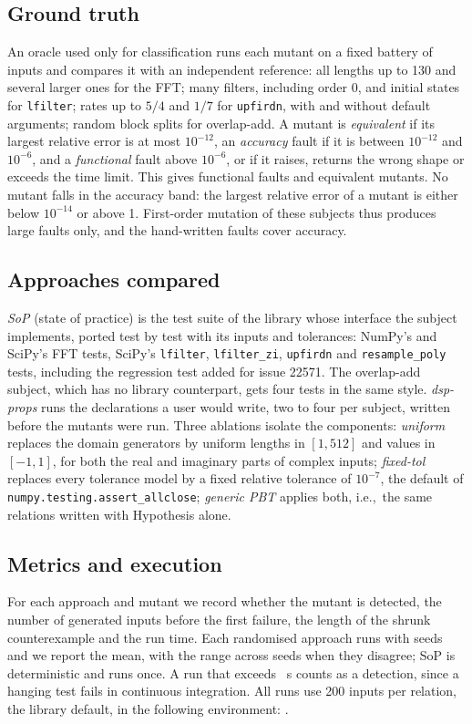 \documentclass[10pt,conference]{IEEEtran}
\newcommand{\code}[1]{\texttt{#1}}
\newcommand{\ie}{i.e.,\ }
\begin{document}
\subsection{Ground truth}
\label{sec:groundtruth}
An oracle used only for classification runs each mutant on a fixed battery of
inputs and compares it with an independent reference: all lengths up to 130
and several larger ones for the FFT; many filters, including order 0, and
initial states for \code{lfilter}; rates up to $5/4$ and $1/7$ for
\code{upfirdn}, with and without default arguments; random block splits for
overlap-add. A mutant is \emph{equivalent} if its largest relative error is at
most $10^{-12}$, an \emph{accuracy} fault if it is between $10^{-12}$ and
$10^{-6}$, and a \emph{functional} fault above $10^{-6}$, or if it raises,
returns the wrong shape or exceeds the time limit. This gives \nFunctional{}
functional faults and \nEquivalent{} equivalent mutants. No mutant falls in the
accuracy band: the largest relative error of a mutant is either below
$10^{-14}$ or above 1. First-order mutation of these subjects thus produces
large faults only, and the hand-written faults cover accuracy.

\subsection{Approaches compared}
\emph{SoP} (state of practice) is the test suite of the library whose
interface the subject implements, ported test by test with its inputs and
tolerances: NumPy's and SciPy's FFT tests, SciPy's \code{lfilter},
\code{lfilter\_zi}, \code{upfirdn} and \code{resample\_poly} tests, including
the regression test added for issue 22571. The overlap-add subject, which has no
library counterpart, gets four tests in the same style. \emph{dsp-props} runs
the declarations a user would write, two to four per subject, written before
the mutants were run. Three ablations isolate the components: \emph{uniform}
replaces the domain generators by uniform lengths in $[1,512]$ and values in
$[-1,1]$, for both the real and imaginary parts of complex inputs; \emph{fixed-tol} replaces every tolerance model by a fixed relative
tolerance of $10^{-7}$, the default of \code{numpy.testing.assert\_allclose};
\emph{generic PBT} applies both, \ie the same relations written with Hypothesis
alone.

\subsection{Metrics and execution}
For each approach and mutant we record whether the mutant is detected, the
number of generated inputs before the first failure, the length of the shrunk
counterexample and the run time. Each randomised approach runs with \nSeeds{}
seeds and we report the mean, with the range across seeds when they disagree;
SoP is deterministic and runs once. A run that exceeds \timeoutSeconds{}~s
counts as a detection, since a hanging test fails in continuous integration.
All runs use 200 inputs per relation, the library default, in the following
environment: \envDescription.
\end{document}
